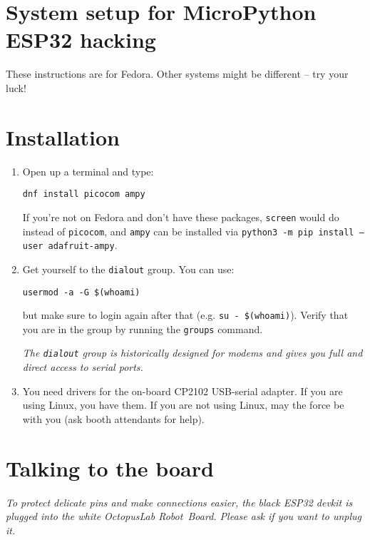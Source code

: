 \documentclass[a4paper,10pt]{article}
\newcommand\plpage{
    \newpage
}
\begin{document}
\plpage

\section*{System setup for MicroPython ESP32 hacking}

These instructions are for Fedora.
Other systems might be different – try your luck!

\section*{Installation}

\begin{enumerate}

\item Open up a terminal and type:

    \texttt{dnf install picocom ampy}

    If you're not on Fedora and don't have these packages,
    \texttt{screen} would do instead of \texttt{picocom},
    and \texttt{ampy} can be installed via
    \texttt{python3 -m pip install --user adafruit-ampy}.

\item Get yourself to the \texttt{dialout} group.
      You can use:

      \texttt{usermod -a -G \$(whoami)}

      but make sure to login again after that
      (e.g. \texttt{su - \$(whoami)}).
      Verify that you are in the group by running the \texttt{groups} command.

    \textit{
      The \texttt{dialout} group is historically designed for modems
      and gives you full and direct access to serial ports.
    }

\item You need drivers for the on-board CP2102 USB-serial adapter.
    If you are using Linux, you have them.
      If you are not using Linux, may the force be with you
      (ask booth attendants for help).

\end{enumerate}


\section*{Talking to the board}

\textit{
    To protect delicate pins and make connections easier,
    the black ESP32 devkit is plugged into the white OctopusLab Robot~Board.
    Please ask if you want to unplug it.
}
\end{document}
